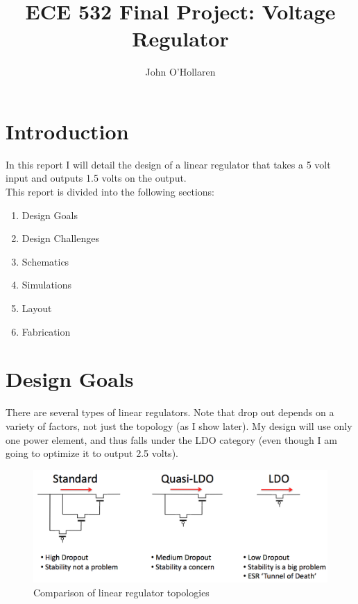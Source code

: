\documentclass[10pt]{amsart}
\title{ECE 532 Final Project: Voltage Regulator}
\author{John O'Hollaren}
\begin{document}
\maketitle

\section{Introduction}
In this report I will detail the design of a linear regulator that takes a 5 volt input and outputs 1.5 volts on the output.\\

This report is divided into the following sections:
\begin{enumerate}
\item Design Goals
\item Design Challenges
\item Schematics
\item Simulations
\item Layout
\item Fabrication
\end{enumerate}

\newpage

\section{Design Goals}

There are several types of linear regulators. Note that drop out depends on a variety of factors, not just the topology (as I show later). My design will use only one power element, and thus falls under the LDO category (even though I am going to optimize it to output 2.5 volts).

\begin{figure}[h]
	\begin{center}
		\includegraphics[width=6in]{Media/ldos.png}
	\end{center}
	\caption{Comparison of linear regulator topologies}
	\label{fig:wl}
\end{figure}
\end{document}
